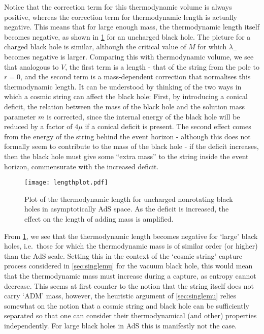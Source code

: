 \documentclass[
twoside,
openright,
frontopenright,
]{dmathesis}
\begin{document}
Notice that the correction term for this thermodynamic volume is always
positive, whereas the correction term for thermodynamic length is actually
negative.  This means that for large enough mass, the thermodynamic length
itself becomes negative, as shown in \cref{fig:TDlength} for an uncharged black
hole. The picture for a charged black hole is similar, although the critical
value of $M$ for which $\lambda_-$ becomes negative is larger. Comparing this
with thermodynamic volume, we see that analogous to $V$, the first term is a
length - that of the string from the pole to $r=0$, and the second term is a
mass-dependent correction that normalises this thermodynamic length.  It can be
understood by thinking of the two ways in which a cosmic string can affect the
black hole: First, by introducing a conical deficit, the relation between the
mass of the black hole and the solution mass parameter $m$ is corrected, since
the internal energy of the black hole will be reduced by a factor of $4\mu$ if a
conical deficit is present.  The second effect comes from the energy of the
string behind the event horizon - although this does not formally seem to
contribute to the mass of the black hole - if the deficit increases, then the
black hole must give some ``extra mass'' to the string inside the event horizon,
commensurate with the increased deficit.
\begin{figure}
  \centering
  \texttt{[image: lengthplot.pdf]}
  \caption{\label{fig:TDlength}Plot of the thermodynamic length for uncharged
    nonrotating black holes in asymptotically AdS space. As the deficit is
    increased, the effect on the length of adding mass is amplified.}
\end{figure}


From \cref{fig:TDlength}, we see that the thermodynamic length becomes negative
for `large' black holes, i.e.\ those for which the thermodynamic mass is of
similar order (or higher) than the AdS scale. Setting this in the context of the
`cosmic string' capture process considered in \cref{sec:singlemu} for the vacuum
black hole, this would mean that the thermodynamic mass must increase during a
capture, as entropy cannot decrease. This seems at first counter to the notion
that the string itself does not carry `ADM' mass, however, the heuristic
argument of \cref{sec:singlemu} relies somewhat on the notion that a cosmic
string and black hole can be sufficiently separated so that one can consider
their thermodynamical (and other) properties independently. For large black
holes in AdS this is manifestly not the case.
\end{document}
